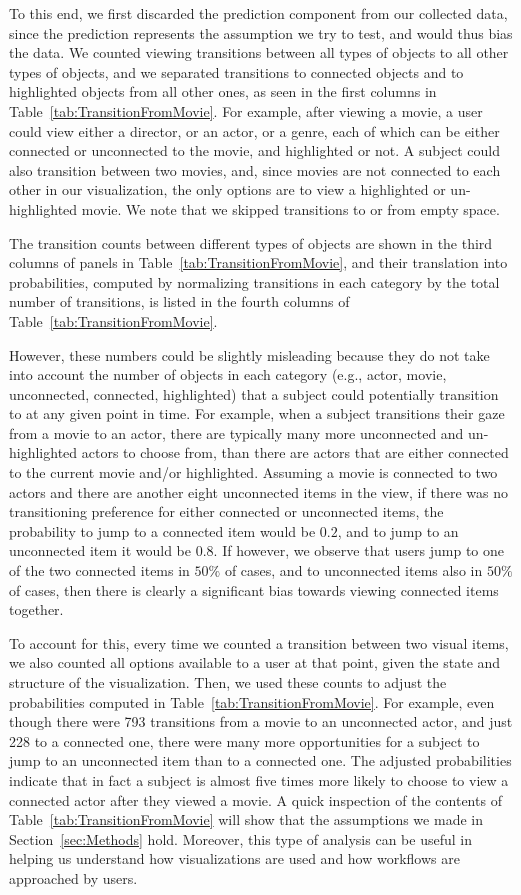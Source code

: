 To this end, we first discarded the prediction component from our collected data, since the prediction represents the assumption we try to test, and would thus bias the data. We counted viewing transitions between all types of objects to all other types of objects, and we separated transitions to connected objects and to highlighted objects from all other ones, as seen in the first columns in Table~\ref{tab:TransitionFromMovie}.  For example, after viewing a movie, a user could view either a director, or an actor, or a genre, each of which can be either connected or unconnected to the movie, and highlighted or not. A subject could also transition between two movies, and, since movies are not connected to each other in our visualization, the only options are to view a highlighted or un-highlighted movie.  We note that we skipped transitions to or from empty space.  

The transition counts between different types of objects are shown in the third columns of panels in Table~\ref{tab:TransitionFromMovie}, and their translation into probabilities, computed by normalizing transitions in each category by the total number of transitions, is listed in the fourth columns of Table~\ref{tab:TransitionFromMovie}. 

However, these numbers could be slightly misleading because they do not take into account the number of objects in each category (e.g., actor, movie, unconnected, connected, highlighted) that a  subject could potentially transition to at any given point in time. For example, when a subject transitions their gaze from a movie to an actor, there are typically many more unconnected and un-highlighted actors to choose from, than there are actors that are either connected to the current movie and/or highlighted. Assuming a movie is connected to two actors and there are another eight unconnected items in the view, if there was no transitioning preference for either connected or unconnected items, the probability to jump to a connected item would be $0.2$, and to jump to an unconnected item it would be $0.8$. If however, we observe that users jump to one of the two connected items in $50\%$ of cases, and to unconnected items also in $50\%$ of cases, then there is clearly a significant bias towards viewing connected items together.

To account for this, every time we counted a transition between two visual items, we also counted all options available to a user at that point, given the state and structure of the visualization. Then, we used these counts to adjust the probabilities computed in Table~\ref{tab:TransitionFromMovie}. For example, even though there were 793 transitions from a movie to an unconnected actor, and just 228 to a connected one, there were many more opportunities for a subject to jump to an unconnected item than to a connected one. The adjusted probabilities indicate that in fact a subject is almost five times more likely to choose to view a connected actor after they viewed a movie. A quick inspection of the contents of Table~\ref{tab:TransitionFromMovie} will show that the assumptions we made in Section~\ref{sec:Methods} hold. Moreover, this type of analysis can be useful in helping us understand how visualizations are used and how workflows are approached by users.

